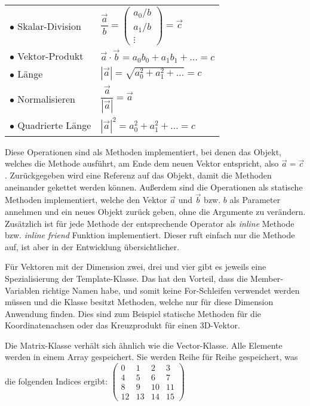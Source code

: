 \begin{longtable}[l]{ll}
		$\bullet$ Skalar-Division		& $\dfrac{\overrightarrow{a}}{b} = \begin{pmatrix} a_{0} / b \\ a_{1} / b\\ \vdots  \end{pmatrix} = \overrightarrow{c}$ \\
		$\bullet$ Vektor-Produkt		& $\overrightarrow{a} \cdot \overrightarrow{b} = a_{0}b_{0} + a_{1}b_{1} + \dots = c$\\
		$\bullet$ Länge		& $|\overrightarrow{a}| = \sqrt{a_{0}^{2}+a_{1}^{2}+\dots} = c$\\
		$\bullet$ Normalisieren			& $\dfrac{\overrightarrow{a}}{|\overrightarrow{a}|} = \overrightarrow{a}$\\
		$\bullet$ Quadrierte Länge		& $|\overrightarrow{a}|^{2} = a_{0}^{2}+a_{1}^{2}+\dots = c$\\
	\end{longtable}

Diese Operationen sind als Methoden implementiert, bei denen das Objekt, welches die Methode ausführt, am Ende dem neuen Vektor entspricht, also $\overrightarrow{a} = \overrightarrow{c}$. Zurückgegeben wird eine Referenz auf das Objekt, damit die Methoden aneinander gekettet werden können. Außerdem sind die Operationen als statische Methoden implementiert, welche den Vektor $\overrightarrow{a}$ und  $\overrightarrow{b}$ bzw. $b$ als Parameter annehmen und ein neues Objekt zurück geben, ohne die Argumente zu verändern. Zusätzlich ist für jede Methode der entsprechende Operator als \textit{inline} Methode bzw. \textit{inline friend} Funktion implementiert. 
Dieser ruft einfach nur die Methode auf, ist aber in der Entwicklung übersichtlicher.

Für Vektoren mit der Dimension zwei, drei und vier gibt es jeweils eine Spezialisierung der Template-Klasse. Das hat den Vorteil, dass die Member-Variablen richtige Namen habe, und somit keine For-Schleifen verwendet werden müssen und die Klasse besitzt Methoden, welche nur für diese Dimension Anwendung finden. Dies sind zum Beispiel statische Methoden für die Koordinatenachsen oder das Kreuzprodukt für einen 3D-Vektor.

Die Matrix-Klasse verhält sich ähnlich wie die Vector-Klasse. Alle Elemente werden in einem Array gespeichert. Sie werden Reihe für Reihe gespeichert, was die folgenden Indices ergibt: \newline
$\begin{pmatrix}
	0 & 1 & 2 & 3 \\
	4 & 5 & 6 & 7 \\
	8 & 9 & 10 & 11 \\
	12 & 13 & 14 & 15
\end{pmatrix}$

